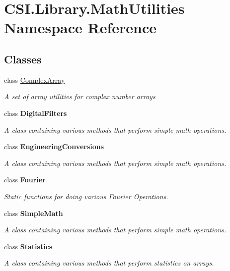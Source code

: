 \hypertarget{namespace_c_s_i_1_1_library_1_1_math_utilities}{}\section{C\+S\+I.\+Library.\+Math\+Utilities Namespace Reference}
\label{namespace_c_s_i_1_1_library_1_1_math_utilities}
\subsection*{Classes}
\begin{DoxyCompactItemize}
\item 
class \mbox{\hyperlink{class_c_s_i_1_1_library_1_1_math_utilities_1_1_complex_array}{Complex\+Array}}
\begin{DoxyCompactList}\small\item\em A set of array utilities for complex number arrays \end{DoxyCompactList}\item 
class {\bfseries Digital\+Filters}
\begin{DoxyCompactList}\small\item\em A class containing various methods that perform simple math operations. \end{DoxyCompactList}\item 
class {\bfseries Engineering\+Conversions}
\begin{DoxyCompactList}\small\item\em A class containing various methods that perform simple math operations. \end{DoxyCompactList}\item 
class {\bfseries Fourier}
\begin{DoxyCompactList}\small\item\em Static functions for doing various Fourier Operations. \end{DoxyCompactList}\item 
class {\bfseries Simple\+Math}
\begin{DoxyCompactList}\small\item\em A class containing various methods that perform simple math operations. \end{DoxyCompactList}\item 
class {\bfseries Statistics}
\begin{DoxyCompactList}\small\item\em A class containing various methods that perform statistics on arrays. \end{DoxyCompactList}\item 

\end{DoxyCompactItemize}
